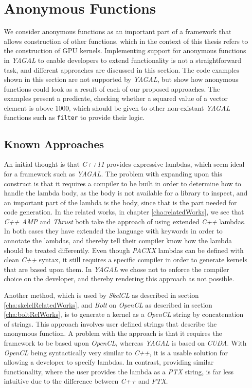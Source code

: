 \section{Anonymous Functions} \label{sec:lambdaProblem}
We consider anonymous functions as an important part of a framework that allows construction of other functions, which in the context of this thesis refers to the construction of GPU kernels. Implementing support for anonymous functions in \textit{YAGAL} to enable developers to extend functionality is not a straightforward task, and different approaches are discussed in this section. The code examples shown in this section are not supported by \textit{YAGAL}, but show how anonymous functions could look as a result of each of our proposed approaches. The examples present a predicate, checking whether a squared value of a vector element is above 1000, which should be given to other non-existant \textit{YAGAL} functions such as \texttt{filter} to provide their logic.

\subsection{Known Approaches}
An initial thought is that \textit{C++11} provides expressive lambdas, which seem ideal for a framework such as \textit{YAGAL}. The problem with expanding upon this construct is that it requires a compiler to be built in order to determine how to handle the lambda body, as the body is not available for a library to inspect\cite{cppLambdaRef}, and an important part of the lambda is the body, since that is the part needed for code generation. In the related works, in chapter \ref{cha:relatedWorks}, we see that \textit{C++ AMP} and \textit{Thrust} both take the approach of using extended \textit{C++} lambdas. In both cases they have extended the language with keywords in order to annotate the lambdas, and thereby tell their compiler know how the lambda should be treated differently. Even though \textit{PACXX} lambdas can be defined with clean \textit{C++} syntax, it still requires a specific compiler in order to generate kernels that are based upon them. In \textit{YAGAL} we chose not to enforce the compiler choice on the developer, and thereby rendering this approach as not possible.

Another method, which is used by \textit{SkelCL} as described in section \ref{cha:skelclRelatedWorks}, and \textit{Bolt} on \textit{OpenCL} as described in section \ref{cha:boltRelWorks}, is to generate a kernel as a \textit{OpenCL} string by concatenation of strings. This approach involves user defined strings that describe the anonymous function. A problem with the approach is that it requires the framework to be based upon \textit{OpenCL}, whereas \textit{YAGAL} is based on \textit{CUDA}. With \textit{OpenCL} being syntactically very similar to \textit{C++}, it is a usable solution for allowing a developer to specify lambdas. In contrast, providing similar functionality, where the user provides the lambda as a \textit{PTX} string, is far less intuitive due to the difference between \textit{C++} and \textit{PTX}.

